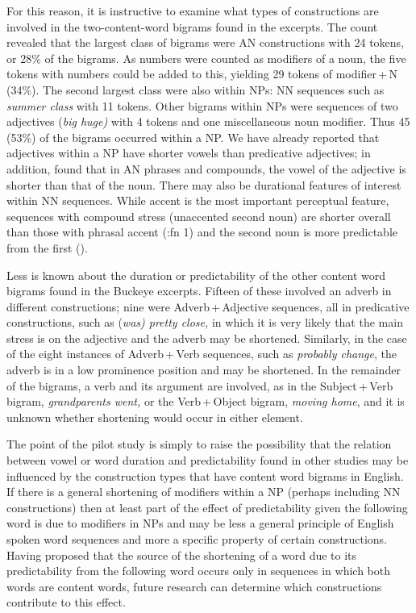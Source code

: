 \documentclass[output=paper]{langscibook}
\begin{document}
For this reason, it is instructive to examine what types of constructions are involved in the two-content-word bigrams found in the excerpts. The count revealed that the largest class of bigrams were AN constructions with 24 tokens, or 28\% of the bigrams. As numbers were counted as modifiers of a noun, the five tokens with numbers could be added to this, yielding 29 tokens of modifier\,+\,N (34\%). The second largest class were also within NPs: NN sequences such as \textit{summer class} with 11 tokens. Other bigrams within NPs were sequences of two adjectives (\textit{big huge)} with 4 tokens and one miscellaneous noun modifier. Thus 45 (53\%) of the bigrams occurred within a NP. We have already reported that adjectives within a NP have shorter vowels than predicative adjectives; in addition, \citealt{Morrill2011} found that in AN phrases and compounds, the vowel of the adjective is shorter than that of the noun. There may also be durational features of interest within NN sequences. While accent is the most important perceptual feature, sequences with compound stress (unaccented second noun) are shorter overall than those with phrasal accent (\citealt{Hirst1983}:fn 1) and the second noun is more predictable from the first (\citealt{BellPlag2012}). 

Less is known about the duration or predictability of the other content word bigrams found in the Buckeye excerpts. Fifteen of these involved an adverb in different constructions; nine were Adverb\,+\,Adjective sequences, all in predicative constructions, such as (\textit{was) pretty close,} in which it is very likely that the main stress is on the adjective and the adverb may be shortened. Similarly, in the case of the eight instances of Adverb\,+\,Verb sequences, such as \textit{probably change}, the adverb is in a low prominence position and may be shortened. In the remainder of the bigrams, a verb and its argument are involved, as in the Subject\,+\,Verb bigram, \textit{grandparents went,} or the Verb\,+\,Object bigram, \textit{moving home}, and it is unknown whether shortening would occur in either element.

The point of the pilot study is simply to raise the possibility that the relation between vowel or word duration and predictability found in other studies may be influenced by the construction types that have content word bigrams in English. If there is a general shortening of modifiers within a NP (perhaps including NN constructions) then at least part of the effect of predictability given the following word is due to modifiers in NPs and may be less a general principle of English spoken word sequences and more a specific property of certain constructions. Having proposed that the source of the shortening of a word due to its predictability from the following word occurs only in sequences in which both words are content words, future research can determine which constructions contribute to this effect. 
\end{document}
